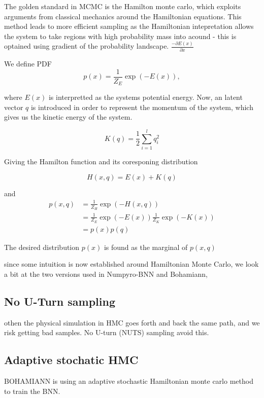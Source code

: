 \begin{testexample}[HMC]
The golden standard in MCMC is the Hamilton monte carlo, which exploits arguments from classical mechanics
around the Hamiltonian equations. This method leads to more efficient sampling as the Hamiltonian intepretation allows the system
to take regions with high probability mass into acound - this is optained using gradient
of the probability landscape.  $\frac{-\partial E(x)}{\partial x} $
 
We define PDF
$$p(x) = \frac{1}{Z_E}\exp(-E(x)),$$

where $E(x)$ is interpretted as the systems potential energy. Now, an latent vector $q$ is introduced in order
to represent the momentum of the system, which gives us the kinetic energy of the system. 

$$K(q) = \frac{1}{2}\sum_{i=1}^l q_i^2$$

Giving the Hamilton function and its coresponing distribution

$$H(x,q)= E(x)+K(q)$$

and 
\begin{align}
    p(x,q) &= \frac{1}{Z_H} \exp(-H(x,q))\\
    &= \frac{1}{Z_E} \exp(-E(x))\frac{1}{Z_K} \exp(-K(x))\\
    &= p(x)p(q)
\end{align}

The desired distribution $p(x)$ is found as the marginal of $p(x,q)$

\end{testexample}

since some intuition is now established around Hamiltonian Monte Carlo, 
we look a bit at the two versions used in Numpyro-BNN and Bohamiann, 

\subsection{No U-Turn sampling}

othen the physical simulation in HMC goes forth and back the same path, and we risk getting bad samples.
No U-turn (NUTS) sampling avoid this. 

\subsection{Adaptive stochatic HMC}
BOHAMIANN is using an adaptive stochastic Hamiltonian monte carlo method to train the BNN. 


